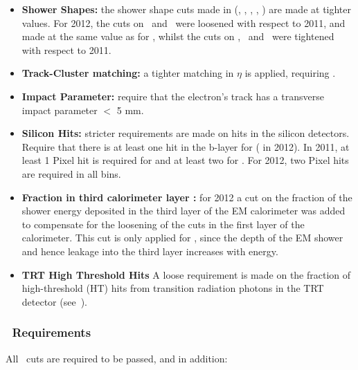 \begin{itemize}
    \item {\bf Shower Shapes:} the shower shape cuts made in \loosePP
    (\Reta, \Rhad, \wetatwo, \Eratio, \wstot) are made at tighter values. For
    2012, the cuts on \Reta\ and \Rhad\ were loosened with respect to 2011, and
    made at the same value as for \loosePP, whilst the cuts on  \wetatwo, \Eratio\ and
    \wstot\ were tightened with respect to 2011.

    \item {\bf Track-Cluster matching:} a tighter matching in $\eta$ is applied,
    requiring .

    \item {\bf Impact Parameter:} require that the electron's track has a
    transverse impact parameter \dzero $<$ 5 mm.

    \item {\bf Silicon Hits:} stricter requirements are made on hits in the
    silicon detectors. Require that there is at least one hit in the b-layer for
     ( in 2012). In 2011, at least 1
    Pixel hit is required for  and at least two for
    . For 2012, two Pixel hits are required in all bins.

    \item {\bf Fraction in third calorimeter layer \fthree:} for 2012 a cut on the
    fraction of the shower energy deposited in the third layer of the EM
    calorimeter was added to compensate for the loosening of the cuts in the
    first layer of the calorimeter. This cut is only applied for , since
    the depth of the EM shower and hence leakage into the third layer increases
    with energy.

    \item {\bf TRT High Threshold Hits} A loose requirement is made on the
    fraction of high-threshold (HT) hits from transition radiation photons in the
    TRT detector (see~).

\end{itemize}

\subsubsection{\tightPP\ Requirements}


All \mediumPP\ cuts are required to be passed, and in addition:

